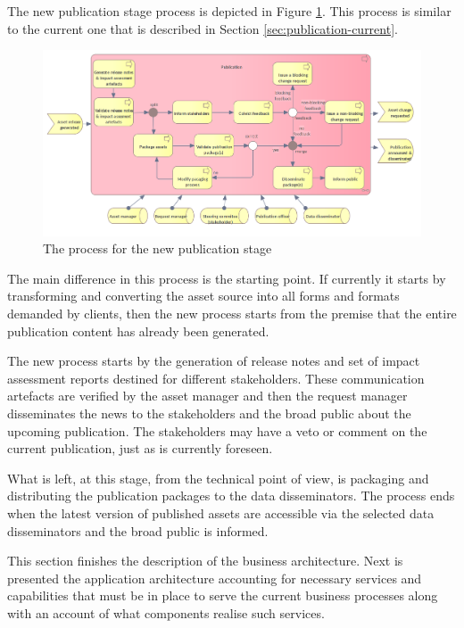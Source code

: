 	The new publication stage process is depicted in Figure \ref{fig:publication-new}. This process is similar to the current one that is described in Section \ref{sec:publication-current}.
	
	\begin{figure}[h]
		\centering
		\includegraphics[width=1.05\textwidth]{images/business/new/Publication.png}
		\caption{The process for the new publication stage}
		\label{fig:publication-new}
	\end{figure}

	The main difference in this process is the starting point. If currently it starts by transforming and converting the asset source into all forms and formats demanded by clients, then the new process starts from the premise that the entire publication content has already been generated. 
	
	The new process starts by the generation of release notes and set of impact assessment reports destined for different stakeholders. These communication artefacts are verified by the asset manager and then the request manager disseminates the news to the stakeholders and the broad public about the upcoming publication. The stakeholders may have a veto or comment on the current publication, just as is currently foreseen.   
	
	What is left, at this stage, from the technical point of view, is packaging and distributing the publication packages to the data disseminators. The process ends when the latest version of published assets are accessible via the selected data disseminators and the broad public is informed. 
	
	This section finishes the description of the business architecture. Next is presented the application architecture accounting for necessary services and capabilities that must be in place to serve the current business processes along with an account of what components realise such services. 
	